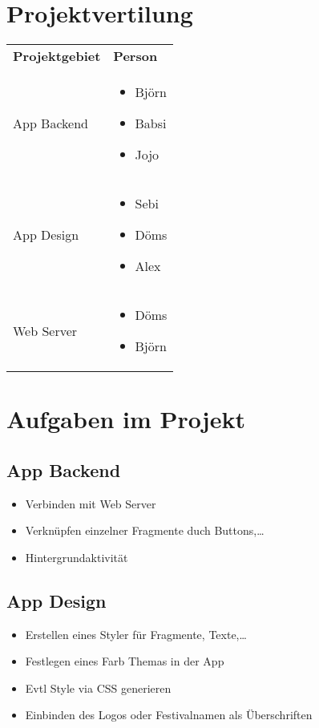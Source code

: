 \documentclass[a4paper,12pt,
headsepline,           %
oneside,               %
pointlessnumbers,      %
bibtotoc,              %
BCOR15mm               %
]{scrbook}
\begin{document}
  \section*{Projektvertilung}
  \begin{tabular}{@{}lP{6cm}@{}} 
      \textbf{Projektgebiet} & \textbf{Person} \\[5pt]
      App Backend &
        \begin{itemize}
          \item Björn 
          \item Babsi
          \item Jojo
        \end{itemize}\\

      App Design &
      \begin{itemize}
          \item Sebi
          \item Döms
          \item Alex
      \end{itemize}\\

      Web Server &
      \begin{itemize}
          \item Döms
          \item Björn
      \end{itemize}\\
  \end{tabular}

  \section*{Aufgaben im Projekt}
  \subsection*{App Backend}
  \begin{itemize}
      \item Verbinden mit Web Server
      \item Verknüpfen einzelner Fragmente duch Buttons,\dots
      \item Hintergrundaktivität
  \end{itemize}

  \subsection*{App Design}
  \begin{itemize}
      \item Erstellen eines Styler für Fragmente, Texte,\dots
      \item Festlegen eines Farb Themas in der App
      \item Evtl Style via CSS generieren
      \item Einbinden des Logos oder Festivalnamen als Überschriften
  \end{itemize}
\end{document}
